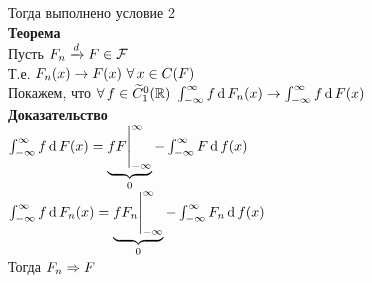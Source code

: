 \documentclass[12pt]{article}
\begin{document}
Тогда выполнено условие 2\\
\textbf{Теорема}\\
Пусть $F_n \xrto{d} F \in \mc F$\\
Т.е. $F_n(x) \rto F(x)\ \fall x \in C(F)$\\
Покажем, что $\fall f \in \ot C^0_1(\Rset)\ \int_{-\infty}^{\infty} f \df F_n(x) \rto \int_{-\infty}^\infty f\df F(x)$\\
\textbf{Доказательство}\\
$\int_{-\infty}^\infty f\df F(x) = \ub{0}{f F\vl_{-\infty}^\infty} - \int_{-\infty}^\infty F \df f(x)$\\
$\int_{-\infty}^{\infty} f \df F_n(x) = \ub{0}{f F_n\vl_{-\infty}^\infty} - \int_{-\infty}^\infty F_n \df f(x)$\\
Тогда $F_n \Rto F$\\
\end{document}
